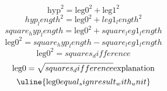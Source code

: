 \[\text{{{hyp}}}^{{2}}=\text{{{leg0}}}^{{2}}+\text{{{leg1}}}^{{2}}\]
\[{hyp_length}^{{2}}=\text{{{leg0}}}^{{2}}+{leg1_length}^{{2}}\]
\[{square_hyp_length}=\text{{{leg0}}}^{{2}}+{square_leg1_length}\]
\[\text{{{leg0}}}^{{2}}={square_hyp_length}-{square_leg1_length}\]
\[\text{{{leg0}}}^{{2}}={squares_difference}\]
\[\text{{{leg0}}}=\sqrt{{\mathstrut {squares_difference}}}\text{{{explanation}}}\]
\[\uline{{\text{{{leg0}}}{equal_sign}{result_with_unit}}}\]
